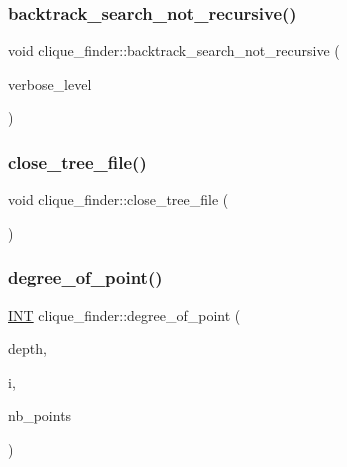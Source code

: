 \subsubsection{\texorpdfstring{backtrack\+\_\+search\+\_\+not\+\_\+recursive()}{backtrack\_search\_not\_recursive()}}
{\footnotesize\ttfamily void clique\+\_\+finder\+::backtrack\+\_\+search\+\_\+not\+\_\+recursive (\begin{DoxyParamCaption}\item[{\mbox{\hyperlink{galois_8h_a09fddde158a3a20bd2dcadb609de11dc}{I\+NT}}}]{verbose\+\_\+level }\end{DoxyParamCaption})}

\mbox{\label{classclique__finder_af6a7aae43d6a1a424f9e57786b490c6c}} 
\subsubsection{\texorpdfstring{close\+\_\+tree\+\_\+file()}{close\_tree\_file()}}
{\footnotesize\ttfamily void clique\+\_\+finder\+::close\+\_\+tree\+\_\+file (\begin{DoxyParamCaption}{ }\end{DoxyParamCaption})}

\mbox{\label{classclique__finder_ad3f084a4d6dfad8cd283f57933d6490d}} 
\subsubsection{\texorpdfstring{degree\+\_\+of\+\_\+point()}{degree\_of\_point()}}
{\footnotesize\ttfamily \mbox{\hyperlink{galois_8h_a09fddde158a3a20bd2dcadb609de11dc}{I\+NT}} clique\+\_\+finder\+::degree\+\_\+of\+\_\+point (\begin{DoxyParamCaption}\item[{\mbox{\hyperlink{galois_8h_a09fddde158a3a20bd2dcadb609de11dc}{I\+NT}}}]{depth,  }\item[{\mbox{\hyperlink{galois_8h_a09fddde158a3a20bd2dcadb609de11dc}{I\+NT}}}]{i,  }\item[{\mbox{\hyperlink{galois_8h_a09fddde158a3a20bd2dcadb609de11dc}{I\+NT}}}]{nb\+\_\+points }\end{DoxyParamCaption})}

